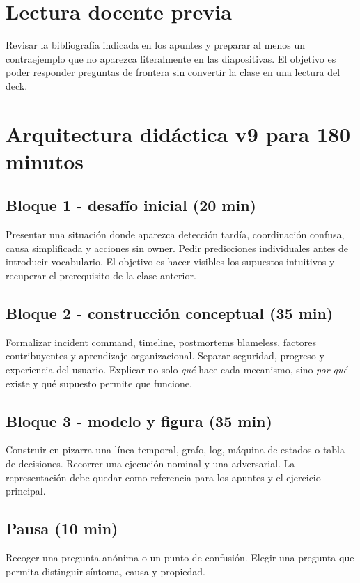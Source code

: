 \documentclass[variant=docente,cover=institutional,mode=screen]{ua-engineering-v6-article}
\begin{document}
\section{Lectura docente previa}
Revisar la bibliografía indicada en los apuntes y preparar al menos un contraejemplo que no aparezca literalmente en las diapositivas. El objetivo es poder responder preguntas de frontera sin convertir la clase en una lectura del deck.

\section{Arquitectura didáctica v9 para 180 minutos}
\subsection*{Bloque 1 - desafío inicial (20 min)}
Presentar una situación donde aparezca detección tardía, coordinación confusa, causa simplificada y acciones sin owner. Pedir predicciones individuales antes de introducir vocabulario. El objetivo es hacer visibles los supuestos intuitivos y recuperar el prerequisito de la clase anterior.

\subsection*{Bloque 2 - construcción conceptual (35 min)}
Formalizar incident command, timeline, postmortems blameless, factores contribuyentes y aprendizaje organizacional. Separar seguridad, progreso y experiencia del usuario. Explicar no solo \emph{qué} hace cada mecanismo, sino \emph{por qué} existe y qué supuesto permite que funcione.

\subsection*{Bloque 3 - modelo y figura (35 min)}
Construir en pizarra una línea temporal, grafo, log, máquina de estados o tabla de decisiones. Recorrer una ejecución nominal y una adversarial. La representación debe quedar como referencia para los apuntes y el ejercicio principal.

\subsection*{Pausa (10 min)}
Recoger una pregunta anónima o un punto de confusión. Elegir una pregunta que permita distinguir síntoma, causa y propiedad.
\end{document}
